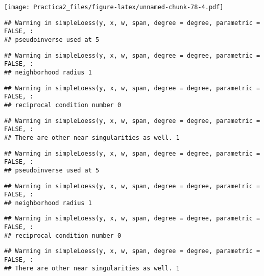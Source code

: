 \documentclass[
]{article}
\newenvironment{Shaded}{\begin{snugshade}}{\end{snugshade}}
\newcommand{\FunctionTok}[1]{\textcolor[rgb]{0.00,0.00,0.00}{#1}}
\newcommand{\NormalTok}[1]{#1}
\newcommand{\SpecialCharTok}[1]{\textcolor[rgb]{0.00,0.00,0.00}{#1}}
\begin{document}
\texttt{[image: Practica2\_files/figure-latex/unnamed-chunk-78-4.pdf]}

\begin{Shaded}
\end{Shaded}

\begin{verbatim}
## Warning in simpleLoess(y, x, w, span, degree = degree, parametric = FALSE, :
## pseudoinverse used at 5
\end{verbatim}

\begin{verbatim}
## Warning in simpleLoess(y, x, w, span, degree = degree, parametric = FALSE, :
## neighborhood radius 1
\end{verbatim}

\begin{verbatim}
## Warning in simpleLoess(y, x, w, span, degree = degree, parametric = FALSE, :
## reciprocal condition number 0
\end{verbatim}

\begin{verbatim}
## Warning in simpleLoess(y, x, w, span, degree = degree, parametric = FALSE, :
## There are other near singularities as well. 1
\end{verbatim}

\begin{verbatim}
## Warning in simpleLoess(y, x, w, span, degree = degree, parametric = FALSE, :
## pseudoinverse used at 5
\end{verbatim}

\begin{verbatim}
## Warning in simpleLoess(y, x, w, span, degree = degree, parametric = FALSE, :
## neighborhood radius 1
\end{verbatim}

\begin{verbatim}
## Warning in simpleLoess(y, x, w, span, degree = degree, parametric = FALSE, :
## reciprocal condition number 0
\end{verbatim}

\begin{verbatim}
## Warning in simpleLoess(y, x, w, span, degree = degree, parametric = FALSE, :
## There are other near singularities as well. 1
\end{verbatim}
\end{document}
